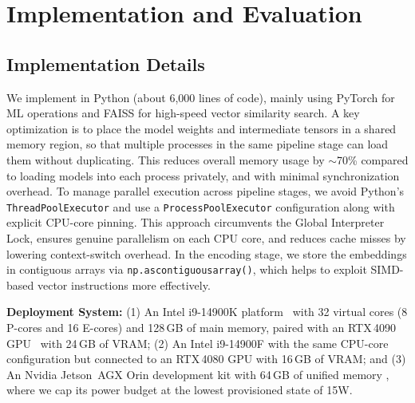 \section{Implementation and Evaluation}
\label{sec:05Implementation}

\subsection{Implementation Details}
\label{subsec:implementation}
We implement \design{} in Python (about 6,000 lines of code), mainly using PyTorch for ML operations and FAISS for high-speed vector similarity search. A key optimization is to place the model weights and intermediate tensors in a shared memory region, so that multiple processes in the same pipeline stage can load them without duplicating. This reduces overall memory usage by $\sim$70\% compared to loading models into each process privately, and with minimal synchronization overhead. To manage parallel execution across pipeline stages, we avoid Python’s \texttt{ThreadPoolExecutor} and use a \texttt{ProcessPoolExecutor} configuration along with explicit CPU-core pinning. This approach circumvents the Global Interpreter Lock, ensures genuine parallelism on each CPU core, and reduces cache misses by lowering context-switch overhead. In the encoding stage, we store the embeddings in contiguous arrays via \texttt{np.ascontiguousarray()}, which helps to exploit SIMD-based vector instructions more effectively.

\noindent\textbf{Deployment System:}  (1) An Intel i9-14900K platform~\cite{intel_cpu} with 32 virtual cores (8 P-cores and 16 E-cores) and 128\,GB of main memory, paired with an RTX\,4090 GPU~\cite{nvidia_rtx_gpu} with 24\,GB of VRAM; (2) An Intel i9-14900F with the same CPU-core configuration but connected to an RTX\,4080 GPU with 16\,GB of VRAM; and (3) An Nvidia Jetson~AGX Orin development kit with 64\,GB of unified memory \cite{nvidia_jetson_orin}, where we cap its power budget at the lowest provisioned state of 15W.

